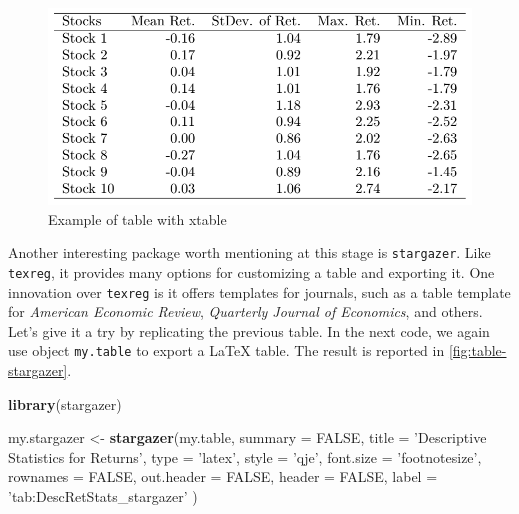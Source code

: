 \documentclass[11pt,]{book}
\newenvironment{Shaded}{\begin{snugshade}}{\end{snugshade}}
\newcommand{\KeywordTok}[1]{\textcolor[rgb]{0.27,0.27,0.27}{\textbf{#1}}}
\newcommand{\DataTypeTok}[1]{\textcolor[rgb]{0.27,0.27,0.27}{#1}}
\newcommand{\StringTok}[1]{\textcolor[rgb]{0.5,0.5,0.5}{#1}}
\newcommand{\OtherTok}[1]{\textcolor[rgb]{0.56,0.35,0.01}{#1}}
\newcommand{\NormalTok}[1]{#1}
\begin{document}
\begin{figure}[!htbp]

{\centering \includegraphics[width=0.75\linewidth]{tabs/table-4-2} 

}

\caption{Example of table with xtable}\label{fig:table-xtable}
\end{figure}

Another interesting package worth mentioning at this stage is
\texttt{stargazer}. Like \texttt{texreg}, it provides many options for
customizing a table and exporting it. One innovation over
\texttt{texreg} is it offers templates for journals, such as a table
template for \emph{American Economic Review}, \emph{Quarterly Journal of
Economics}, and others. Let's give it a try by replicating the previous
table. In the next code, we again use object \texttt{my.table} to export
a LaTeX table. The result is reported in \ref{fig:table-stargazer}.
 

\begin{Shaded}
\begin{Highlighting}[]
\KeywordTok{library}\NormalTok{(stargazer)}

\NormalTok{my.stargazer <-}\StringTok{ }\KeywordTok{stargazer}\NormalTok{(my.table, }
                          \DataTypeTok{summary =} \OtherTok{FALSE}\NormalTok{, }
                          \DataTypeTok{title =} \StringTok{'Descriptive Statistics for Returns'}\NormalTok{, }
                          \DataTypeTok{type =} \StringTok{'latex'}\NormalTok{, }
                          \DataTypeTok{style =} \StringTok{'qje'}\NormalTok{, }
                          \DataTypeTok{font.size =} \StringTok{'footnotesize'}\NormalTok{, }
                          \DataTypeTok{rownames =} \OtherTok{FALSE}\NormalTok{, }
                          \DataTypeTok{out.header =} \OtherTok{FALSE}\NormalTok{,}
                          \DataTypeTok{header =} \OtherTok{FALSE}\NormalTok{,}
                          \DataTypeTok{label =} \StringTok{'tab:DescRetStats_stargazer'}\NormalTok{ )}
\end{Highlighting}
\end{Shaded}
\end{document}
